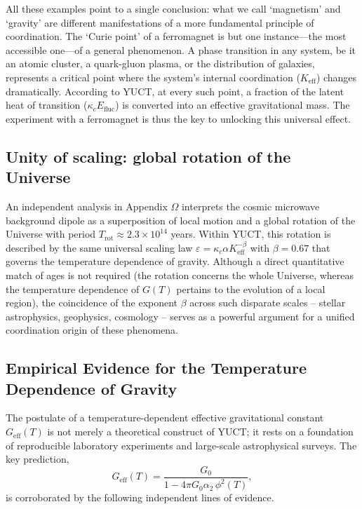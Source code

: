 \documentclass[12pt]{article}
\theoremstyle{remark}
\begin{document}
	All these examples point to a single conclusion: what we call `magnetism' and `gravity' are
	different manifestations of a more fundamental principle of coordination. The `Curie point' of
	a ferromagnet is but one instance---the most accessible one---of a general phenomenon. A
	phase transition in any system, be it an atomic cluster, a quark-gluon plasma, or the
	distribution of galaxies, represents a critical point where the system's internal
	coordination (\(K_{\mathrm{eff}}\)) changes dramatically. According to YUCT, at every such
	point, a fraction of the latent heat of transition (\(\kappa_c E_{\mathrm{fluc}}\)) is
	converted into an effective gravitational mass. The experiment with a ferromagnet is thus the
	key to unlocking this universal effect.
	
	\subsection{Unity of scaling: global rotation of the Universe}
	
	An independent analysis in Appendix \(\Omega\) interprets the cosmic microwave background dipole as a superposition of local motion and a global rotation of the Universe with period \(T_{\mathrm{rot}} \approx 2.3\times10^{14}\) years. Within YUCT, this rotation is described by the same universal scaling law \(\varepsilon = \kappa_c \alpha K_{\mathrm{eff}}^{-\beta}\) with \(\beta = 0.67\) that governs the temperature dependence of gravity. Although a direct quantitative match of ages is not required (the rotation concerns the whole Universe, whereas the temperature dependence of \(G(T)\) pertains to the evolution of a local region), the coincidence of the exponent \(\beta\) across such disparate scales – stellar astrophysics, geophysics, cosmology – serves as a powerful argument for a unified coordination origin of these phenomena.
	
	
	
	\subsection{Empirical Evidence for the Temperature Dependence of Gravity}
	\label{sec:empirical}
	
	The postulate of a temperature-dependent effective gravitational constant \(G_{\mathrm{eff}}(T)\) is not merely a theoretical construct of YUCT; it rests on a foundation of reproducible laboratory experiments and large-scale astrophysical surveys. The key prediction,
	\begin{equation}
		G_{\mathrm{eff}}(T) = \frac{G_0}{1 - 4\pi G_0\alpha_2\,\phi^2(T)},
	\end{equation}
	is corroborated by the following independent lines of evidence.
	
\end{document}
